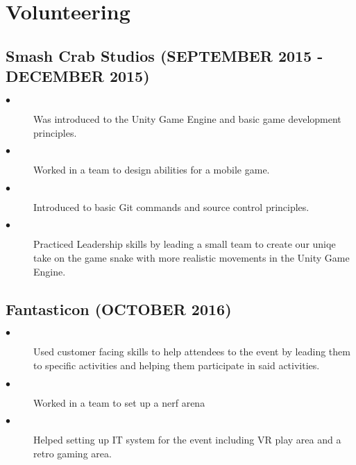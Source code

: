 \documentclass{article}
\begin{document}
\section{Volunteering}
\noindent
\hfill
\begin{minipage}[t]{1\textwidth}
    \subsection{Smash Crab Studios \footnotesize{(SEPTEMBER 2015 - DECEMBER 2015)}}
    \normalsize{}
    \begin{description}
        \item[$\bullet$] Was introduced to the Unity Game Engine and basic game development principles. 
        \item[$\bullet$] Worked in a team to design abilities for a mobile game.  
        \item[$\bullet$] Introduced to basic Git commands and source control principles.
        \item[$\bullet$] Practiced Leadership skills by leading a small team to create our uniqe take on the game snake with more realistic movements in the Unity Game Engine. 
    \end{description}

    \subsection{Fantasticon \footnotesize{(OCTOBER 2016)}}
    \normalsize{}
    \begin{description}
        \item[$\bullet$] Used customer facing skills to help attendees to the event by leading them to specific activities and helping them participate in said activities. 
        \item[$\bullet$] Worked in a team to set up a nerf arena
        \item[$\bullet$] Helped setting up IT system for the event including VR play area and a retro gaming area. 
    \end{description}

\end{minipage}
\end{document}
